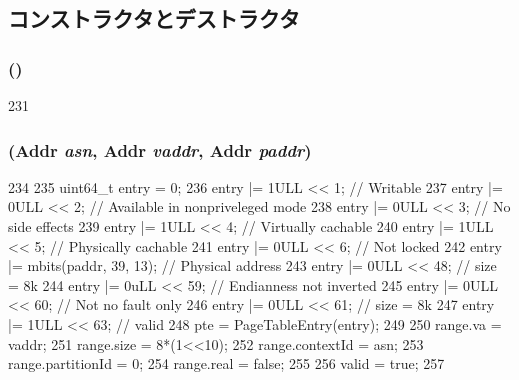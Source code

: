 \subsection{コンストラクタとデストラクタ}
\hypertarget{structSparcISA_1_1TlbEntry_ad069716fb78ffaa2d9bfba679a8eac9a}{
\subsubsection[{TlbEntry}]{ ()}}
\label{structSparcISA_1_1TlbEntry_ad069716fb78ffaa2d9bfba679a8eac9a}



\begin{DoxyCode}
231     {}
\end{DoxyCode}
\hypertarget{structSparcISA_1_1TlbEntry_a69a4824fbe38adbd1517dda05272617d}{
\subsubsection[{TlbEntry}]{ ({\bf Addr} {\em asn}, \/  {\bf Addr} {\em vaddr}, \/  {\bf Addr} {\em paddr})}}
\label{structSparcISA_1_1TlbEntry_a69a4824fbe38adbd1517dda05272617d}



\begin{DoxyCode}
234     {
235         uint64_t entry = 0;
236         entry |= 1ULL << 1; // Writable
237         entry |= 0ULL << 2; // Available in nonpriveleged mode
238         entry |= 0ULL << 3; // No side effects
239         entry |= 1ULL << 4; // Virtually cachable
240         entry |= 1ULL << 5; // Physically cachable
241         entry |= 0ULL << 6; // Not locked
242         entry |= mbits(paddr, 39, 13); // Physical address
243         entry |= 0ULL << 48; // size = 8k
244         entry |= 0uLL << 59; // Endianness not inverted
245         entry |= 0ULL << 60; // Not no fault only
246         entry |= 0ULL << 61; // size = 8k
247         entry |= 1ULL << 63; // valid
248         pte = PageTableEntry(entry);
249 
250         range.va = vaddr;
251         range.size = 8*(1<<10);
252         range.contextId = asn;
253         range.partitionId = 0;
254         range.real = false;
255 
256         valid = true;
257     }
\end{DoxyCode}



